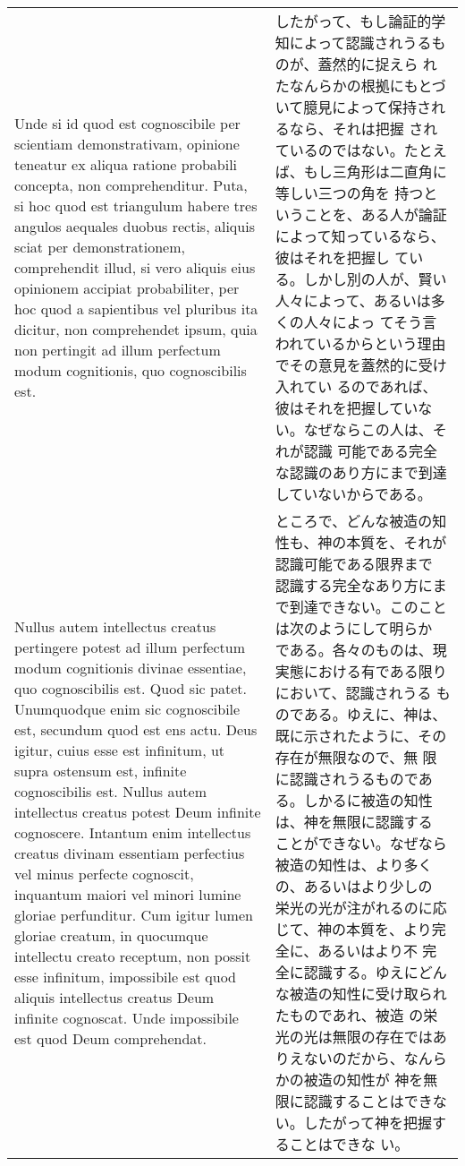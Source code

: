 \documentclass[10pt]{jsarticle} %
\begin{document}
\begin{longtable}{p{21em}p{21em}}
\\


Unde si id quod est cognoscibile per scientiam demonstrativam,
opinione teneatur ex aliqua ratione probabili concepta, non
comprehenditur. Puta, si hoc quod est triangulum habere tres angulos
aequales duobus rectis, aliquis sciat per demonstrationem,
comprehendit illud, si vero aliquis eius opinionem accipiat
probabiliter, per hoc quod a sapientibus vel pluribus ita dicitur, non
comprehendet ipsum, quia non pertingit ad illum perfectum modum
cognitionis, quo cognoscibilis est.

&

したがって、もし論証的学知によって認識されうるものが、蓋然的に捉えら
れたなんらかの根拠にもとづいて臆見によって保持されるなら、それは把握
されているのではない。たとえば、もし三角形は二直角に等しい三つの角を
持つということを、ある人が論証によって知っているなら、彼はそれを把握し
ている。しかし別の人が、賢い人々によって、あるいは多くの人々によっ
てそう言われているからという理由でその意見を蓋然的に受け入れてい
るのであれば、彼はそれを把握していない。なぜならこの人は、それが認識
可能である完全な認識のあり方にまで到達していないからである。


\\

Nullus autem intellectus creatus pertingere potest ad illum perfectum
modum cognitionis divinae essentiae, quo cognoscibilis est. Quod sic
patet. Unumquodque enim sic cognoscibile est, secundum quod est ens
actu. Deus igitur, cuius esse est infinitum, ut supra ostensum est,
infinite cognoscibilis est. Nullus autem intellectus creatus potest
Deum infinite cognoscere. Intantum enim intellectus creatus divinam
essentiam perfectius vel minus perfecte cognoscit, inquantum maiori
vel minori lumine gloriae perfunditur. Cum igitur lumen gloriae
creatum, in quocumque intellectu creato receptum, non possit esse
infinitum, impossibile est quod aliquis intellectus creatus Deum
infinite cognoscat. Unde impossibile est quod Deum comprehendat.


&

ところで、どんな被造の知性も、神の本質を、それが認識可能である限界まで
認識する完全なあり方にまで到達できない。このことは次のようにして明らか
である。各々のものは、現実態における有である限りにおいて、認識されうる
ものである。ゆえに、神は、既に示されたように、その存在が無限なので、無
限に認識されうるものである。しかるに被造の知性は、神を無限に認識する
ことができない。なぜなら被造の知性は、より多くの、あるいはより少しの
栄光の光が注がれるのに応じて、神の本質を、より完全に、あるいはより不
完全に認識する。ゆえにどんな被造の知性に受け取られたものであれ、被造
の栄光の光は無限の存在ではありえないのだから、なんらかの被造の知性が
神を無限に認識することはできない。したがって神を把握することはできな
い。


\end{longtable}
\end{document}
